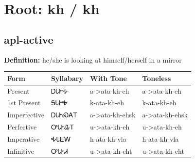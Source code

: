 \documentclass{article}%
\begin{document}
%
\normalsize%
\section*{Root: kh / kh}%
\subsection*{apl-active}%
\textbf{Definition: }%
he/she is looking at himself/herself in a mirror%
\\[0.5em]%
\begin{tabular}{|l|l|l|l|}%
\hline%
\textbf{Form}&\textbf{Syllabary}&\textbf{With Tone}&\textbf{Toneless}\\%
\hline%
Present&ᎠᏓᎨᎭ&a{-}>ata{-}kh{-}eh&a{-}>ata{-}kh{-}eh\\%
1st Present&ᎦᏓᎨᎭ&k{-}ata{-}kh{-}eh&k{-}ata{-}kh{-}eh\\%
Imperfective&ᎠᏓᎨᏍᎪᎢ&a{-}>ata{-}kh{-}ehsk&a{-}>ata{-}kh{-}ehsk\\%
Perfective&ᎤᏓᎨᎲᎢ&u{-}>ata{-}kh{-}eh&u{-}>ata{-}kh{-}eh\\%
Imperative&ᎭᏓᎬᎳ&h{-}ata{-}kh{-}vla&h{-}ata{-}kh{-}vla\\%
Infinitive&ᎤᏓᎨᏗ&u{-}>ata{-}kh{-}eht&u{-}>ata{-}kh{-}eht\\%
\hline%
\end{tabular}%
\\[1em]%
\end{document}
